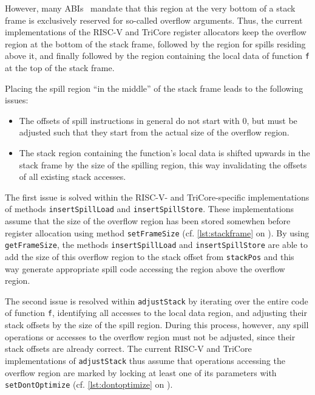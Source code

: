 However, many \gls{ABI}s~\cite{riscv22,tricore07} mandate that this region at the very bottom of a stack frame is exclusively reserved for so-called overflow arguments.
Thus, the current implementations of the RISC-V and TriCore register allocators keep the overflow region at the bottom of the stack frame, followed by the region for spills residing above it, and finally followed by the region containing the local data of function \texttt{f} at the top of the stack frame.

Placing the spill region ``in the middle'' of the stack frame leads to the following issues:
\begin{itemize}
  \item The offsets of spill instructions in general do not start with 0, but must be adjusted such that they start from the actual size of the overflow region.
  \item The stack region containing the function's local data is shifted upwards in the stack frame by the size of the spilling region, this way invalidating the offsets of all existing stack accesses.
\end{itemize}

The first issue is solved within the RISC-V- and TriCore-specific implementations of methods \texttt{insertSpillLoad} and \texttt{insertSpillStore}.
These implementations assume that the size of the overflow region has been stored somewhen before register allocation using method \texttt{setFrameSize} (cf. \cref{lst:stackframe} on ).
By using \texttt{getFrameSize}, the methods \texttt{insertSpillLoad} and \texttt{insertSpillStore} are able to add the size of this overflow region to the stack offset from \texttt{stackPos} and this way generate appropriate spill code accessing the region above the overflow region.

The second issue is resolved within \texttt{adjustStack} by iterating over the entire code of function \texttt{f}, identifying all accesses to the local data region, and adjusting their stack offsets by the size of the spill region.
During this process, however, any spill operations or accesses to the overflow region must not be adjusted, since their stack offsets are already correct.
The current RISC-V and TriCore implementations of \texttt{adjustStack} thus assume that operations accessing the overflow region are marked by locking at least one of its parameters with \texttt{setDontOptimize} (cf. \cref{lst:dontoptimize} on ).

